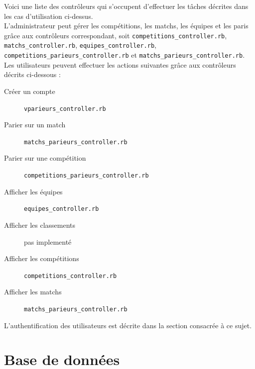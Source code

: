 \documentclass[10pt,a4paper,titlepage]{article}
\begin{document}
Voici une liste des contrôleurs qui s'occupent d'effectuer les tâches décrites dans les cas d'utilisation ci-dessus. \\

L'administrateur peut gérer les compétitions, les matchs, les équipes et les paris grâce aux contrôleurs correspondant, soit \texttt{competitions\_controller.rb}, \texttt{matchs\_controller.rb}, \texttt{equipes\_controller.rb}, \texttt{competitions\_parieurs\_controller.rb} et \texttt{matchs\_parieurs\_controller.rb}. \\

Les utilisateurs peuvent effectuer les actions suivantes grâce aux contrôleurs décrits ci-dessous :
\begin{description}
	\item[Créer un compte] \texttt{vparieurs\_controller.rb}
	\item[Parier sur un match] \texttt{matchs\_parieurs\_controller.rb}
	\item[Parier sur une compétition] \texttt{competitions\_parieurs\_controller.rb}
	\item[Afficher les équipes] \texttt{equipes\_controller.rb}
	\item[Afficher les classements] pas implementé
	\item[Afficher les compétitions] \texttt{competitions\_controller.rb}
	\item[Afficher les matchs] \texttt{matchs\_parieurs\_controller.rb}
\end{description}

L'authentification des utilisateurs est décrite dans la section consacrée à ce sujet. 


\section{Base de données}
\end{document}

